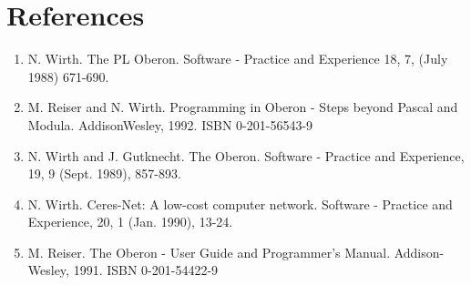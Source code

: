 \section*{References}
\begin{enumerate}
  \item N. Wirth. The PL Oberon. Software - Practice and Experience 18, 7, (July 1988) 671-690.
  \item M. Reiser and N. Wirth. Programming in Oberon - Steps beyond Pascal and Modula. AddisonWesley, 1992. ISBN 0-201-56543-9
  \item N. Wirth and J. Gutknecht. The Oberon. Software - Practice and Experience, 19, 9 (Sept. 1989), 857-893.
  \item N. Wirth. Ceres-Net: A low-cost computer network. Software - Practice and Experience, 20, 1 (Jan. 1990), 13-24.
  \item M. Reiser. The Oberon - User Guide and Programmer's Manual. Addison-Wesley, 1991. ISBN 0-201-54422-9
\end{enumerate}
